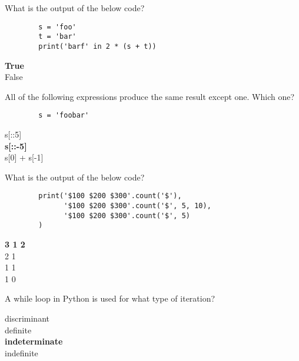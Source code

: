 \documentclass{exam}
\begin{document}
\begin{questions}
    \question What is the output of the below code?
    
    \begin{verbatim}
        s = 'foo'
        t = 'bar'
        print('barf' in 2 * (s + t))
    \end{verbatim}

    \begin{oneparchoices}
        \choice \textbf{True} \\
        \choice False
    \end{oneparchoices}

    \question All of the following expressions produce the same result except one. Which one?
    \begin{verbatim}
        s = 'foobar'
    \end{verbatim}

    \begin{oneparchoices}
        \choice s[::5] \\
        \choice \textbf{s[::-5]} \\
        \choice s[0] + s[-1]
    \end{oneparchoices}

    \question What is the output of the below code?

    \begin{verbatim}
        print('$100 $200 $300'.count('$'),
              '$100 $200 $300'.count('$', 5, 10),
              '$100 $200 $300'.count('$', 5)
        )
    \end{verbatim}

    \begin{oneparchoices}
        \choice \textbf{3 1 2} \\
         2 1 \\
         1 1 \\
         1 0
    \end{oneparchoices}

    \question A while loop in Python is used for what type of iteration?

    \begin{oneparchoices}
        \choice discriminant \\
        \choice definite \\
        \choice \textbf{indeterminate} \\
        \choice indefinite
    \end{oneparchoices}


\end{questions}
\end{document}
